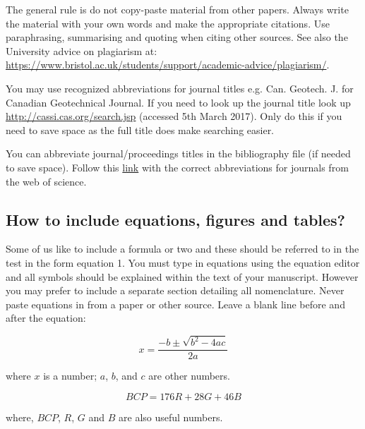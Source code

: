 \documentclass[a4paper,10pt]{article}
\begin{document}
The general rule is do not copy-paste material from other papers. Always write the material with your own words and make the appropriate citations. Use paraphrasing, summarising and quoting when citing other sources.  See also the University advice on plagiarism at: \href{https://www.bristol.ac.uk/students/support/academic-advice/plagiarism/}{https://www.bristol.ac.uk/students/support/academic-advice/plagiarism/}.

You may use recognized abbreviations for journal titles e.g. Can. Geotech. J. for Canadian Geotechnical Journal. If you need to look up the journal title look up \href{http://cassi.cas.org/search.jsp}{http://cassi.cas.org/search.jsp} (accessed 5th March 2017). Only do this if you need to save space as the full title does make searching easier.

You can abbreviate journal/proceedings titles in the bibliography file (if needed to save space). Follow this \href{https://images.webofknowledge.com/images/help/WOS/A_abrvjt.html}{link}
with the correct abbreviations for journals from the web of science.



\subsection{How to include equations, figures and tables?}

Some of us like to include a formula or two and these should be referred to in the test in the form equation 1. You must type in equations using the equation editor and all symbols should be explained within the text of your manuscript. However you may prefer to include a separate section detailing all nomenclature. Never paste equations in from a paper or other source. Leave a blank line before and after the equation:

\begin{equation}
x = \frac{-b \pm \sqrt{b^2 - 4ac} }{2a}
\end{equation}

where $x$ is a number; $a$, $b$, and $c$ are other numbers.

\begin{equation}
BCP = 176R+28G+46B
\end{equation}

where, $BCP$, $R$, $G$ and $B$ are also useful numbers.
\end{document}
